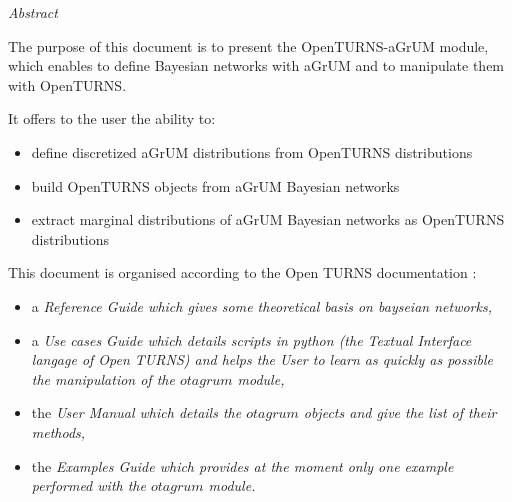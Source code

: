 \vspace{0.5in}
\begin{center}
\vspace{0.3in}
\emph{ Abstract}
\vspace{0.5in}
\end{center}

The purpose of this document is to present the OpenTURNS-aGrUM module, which enables to define Bayesian networks with aGrUM and to manipulate them with OpenTURNS.

It offers to the user the ability to:
\begin{itemize}
\item define discretized aGrUM distributions from OpenTURNS distributions
\item build OpenTURNS objects from aGrUM Bayesian networks
\item extract marginal distributions of aGrUM Bayesian networks as OpenTURNS distributions
\end{itemize}
This document is organised according to the Open TURNS documentation : 
\begin{itemize}
\item a \itshape{Reference Guide} which gives some theoretical basis on bayseian networks,
\item a \itshape{Use cases Guide} which details scripts in python (the Textual Interface langage of Open TURNS) and helps the User to learn as quickly as possible the manipulation of the $otagrum$ module,
\item the \itshape{User Manual} which details the $otagrum$ objects and give the list of their methods,
\item the \itshape{Examples Guide} which provides at the moment only one example performed with the  $otagrum$ module.
\end{itemize}
